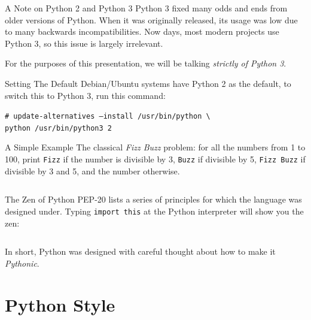 \documentclass{lug}
\begin{document}
\begin{frame}{A Note on Python 2 and Python 3}
    Python 3 fixed many odds and ends from older versions of Python. When it
    was originally released, its usage was low due to many backwards
    incompatibilities. Now days, most modern projects use Python 3, so this
    issue is largely irrelevant.

    For the purposes of this presentation, we will be talking \emph{strictly of
    Python 3}.

    \pause
    \medskip

    \begin{block}{Setting The Default}
        \small
        Debian/Ubuntu systems have Python 2 as the default, to switch this to
        Python 3, run this command:

        \texttt{\# update-alternatives --install /usr/bin/python \textbackslash \\
        \phantom{\#} python /usr/bin/python3 2}
    \end{block}
\end{frame}

\begin{frame}{A Simple Example}
    The classical \emph{Fizz Buzz} problem: for all the numbers from 1 to 100,
    print \texttt{Fizz} if the number is divisible by 3, \texttt{Buzz} if
    divisible by 5, \texttt{Fizz Buzz} if divisible by 3 and 5, and the number
    otherwise.

    \inputminted{python3}{examples/fizzbuzz.py}
\end{frame}

\begin{frame}{The Zen of Python}
    PEP-20 lists a series of principles for which the language was designed
    under. Typing \texttt{import this} at the Python interpreter will show you
    the zen:

    \inputminted{pycon}{console/importthis.py}

    \pause

    In short, Python was designed with careful thought about how to make it
    \emph{Pythonic}.
\end{frame}

\section{Python Style}
\end{document}
